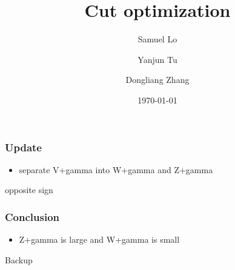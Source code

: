 \documentclass[mathserif,serif]{beamer}
\title{Cut optimization}
\author
{
Samuel Lo \inst{1}
\and
Yanjun Tu  \inst{1}
\and
Dongliang Zhang  \inst{2}
}
\institute
{
\inst{1}
The University of Hong Kong
\and
\inst{2}
University of Michigan
}
\date{\today}
\begin{document}
\frame{\titlepage}

\begin{frame}
\frametitle{Update}
\begin{itemize}
\small
\item separate V+gamma into W+gamma and Z+gamma
\end{itemize}
\end{frame}

\begin{frame}
\begin{center}
\huge
opposite sign
\end{center}
\end{frame}


%

\def \PathToPlot {../plot}


%

\begin{frame}
\frametitle{Conclusion}
\begin{itemize}
\item Z+gamma is large and W+gamma is small
\end{itemize}
\end{frame}


\begin{frame}
\begin{center}
\huge
Backup
\end{center}
\end{frame}
\end{document}
